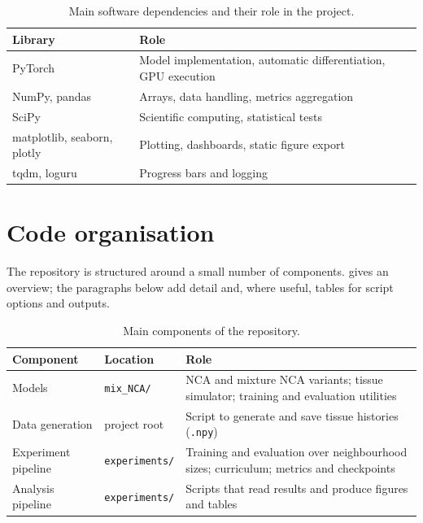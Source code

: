 \begin{table}[htbp]
  \centering
  \caption{Main software dependencies and their role in the project.}
  \label{tab:tools:stack}
  \begin{tabular}{@{}ll@{}}
    \hline
    \textbf{Library} & \textbf{Role} \\
    \hline
    PyTorch & Model implementation, automatic differentiation, GPU execution \\
    NumPy, pandas & Arrays, data handling, metrics aggregation \\
    SciPy & Scientific computing, statistical tests \\
    matplotlib, seaborn, plotly & Plotting, dashboards, static figure export \\
    tqdm, loguru & Progress bars and logging \\
    \hline
  \end{tabular}
\end{table}

\section{Code organisation}

The repository is structured around a small number of components.
 gives an overview; the paragraphs below add detail and, where useful, tables for script options and outputs.

\begin{table}[htbp]
  \centering
  \caption{Main components of the repository.}
  \label{tab:tools:components}
  \begin{tabular}{@{}llp{6.2cm}@{}}
    \hline
    \textbf{Component} & \textbf{Location} & \textbf{Role} \\
    \hline
    Models & \texttt{mix\_NCA/} & NCA and mixture NCA variants; tissue simulator; training and evaluation utilities \\
    Data generation & project root & Script to generate and save tissue histories (\texttt{.npy}) \\
    Experiment pipeline & \texttt{experiments/} & Training and evaluation over neighbourhood sizes; curriculum; metrics and checkpoints \\
    Analysis pipeline & \texttt{experiments/} & Scripts that read results and produce figures and tables \\
    \hline
  \end{tabular}
\end{table}

